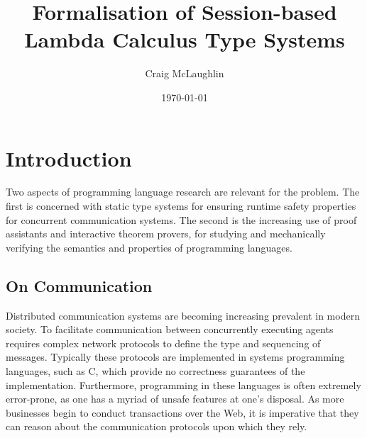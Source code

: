 \documentclass{mprop}
\begin{document}

\title{Formalisation of Session-based Lambda Calculus Type Systems}
\author{Craig McLaughlin}
\date{\today}
\maketitle


\tableofcontents
\newpage

\section{Introduction}\label{intro}

Two aspects of programming language research are relevant for the problem. The first is concerned with static type systems for ensuring runtime safety properties for concurrent communication systems. The second is the increasing use of proof assistants and interactive theorem provers, for studying and mechanically verifying the semantics and properties of programming languages.

\subsection{On Communication}

Distributed communication systems are becoming increasing prevalent in modern society. To facilitate communication between concurrently executing agents requires complex network protocols to define the type and sequencing of messages. Typically these protocols are implemented in systems programming languages, such as C, which provide no correctness guarantees of the implementation. Furthermore, programming in these languages is often extremely error-prone, as one has a myriad of unsafe features at one's disposal. As more businesses begin to conduct transactions over the Web, it is imperative that they can reason about the communication protocols upon which they rely.
\end{document}
